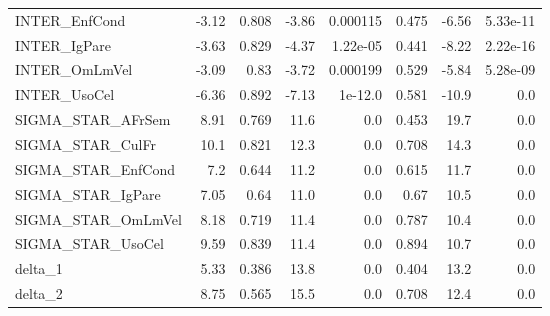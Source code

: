 \begin{tabular}{lrrrrrrr}
INTER\_EnfCond      &  -3.12 &    0.808 &   -3.86 & 0.000115 &         0.475 &        -6.56 &      5.33e-11 \\
INTER\_IgPare       &  -3.63 &    0.829 &   -4.37 & 1.22e-05 &         0.441 &        -8.22 &      2.22e-16 \\
INTER\_OmLmVel      &  -3.09 &     0.83 &   -3.72 & 0.000199 &         0.529 &        -5.84 &      5.28e-09 \\
INTER\_UsoCel       &  -6.36 &    0.892 &   -7.13 &  1e-12.0 &         0.581 &        -10.9 &           0.0 \\
SIGMA\_STAR\_AFrSem  &   8.91 &    0.769 &    11.6 &      0.0 &         0.453 &         19.7 &           0.0 \\
SIGMA\_STAR\_CulFr   &   10.1 &    0.821 &    12.3 &      0.0 &         0.708 &         14.3 &           0.0 \\
SIGMA\_STAR\_EnfCond &    7.2 &    0.644 &    11.2 &      0.0 &         0.615 &         11.7 &           0.0 \\
SIGMA\_STAR\_IgPare  &   7.05 &     0.64 &    11.0 &      0.0 &          0.67 &         10.5 &           0.0 \\
SIGMA\_STAR\_OmLmVel &   8.18 &    0.719 &    11.4 &      0.0 &         0.787 &         10.4 &           0.0 \\
SIGMA\_STAR\_UsoCel  &   9.59 &    0.839 &    11.4 &      0.0 &         0.894 &         10.7 &           0.0 \\
delta\_1            &   5.33 &    0.386 &    13.8 &      0.0 &         0.404 &         13.2 &           0.0 \\
delta\_2            &   8.75 &    0.565 &    15.5 &      0.0 &         0.708 &         12.4 &           0.0 \\
\bottomrule
\end{tabular}

